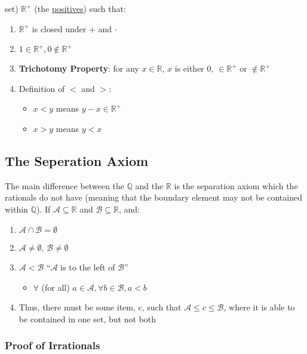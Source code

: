 \documentclass[11 pt, twoside]{article}
\begin{document}
set) $\mathbb{R}^+$ (the \underline{positives}) such that:
\begin{enumerate}
\item $\mathbb{R}^+$ is closed under $+$ and $\cdot$
\item $1 \in \mathbb{R}^+, 0 \notin \mathbb{R}^+$
\item \textbf{Trichotomy Property}: for any $x \in \mathbb{R}$, $x$ is
either $0$, $\in \mathbb{R}^+$ or $\notin \mathbb{R}^+$

\item Definition of $<$ and $>$:
\begin{itemize}
\item $x < y$ means $y - x \in \mathbb{R}^+$
\item $x > y$ means $y < x$
\end{itemize}
\end{enumerate}

\subsection{The Seperation Axiom}

The main difference between the $\mathbb{Q}$ and the $\mathbb{R}$ is the
separation axiom which the rationals do not have (meaning that the boundary element may not be contained within $\mathbb{Q}$). If $\mathcal{A} \subseteq \mathbb{R}$ and $\mathcal{B} \subseteq \mathbb{R}$, and:

\begin{enumerate}
\item $\mathcal{A} \cap \mathcal{B} = \emptyset$
\item $\mathcal{A} \neq \emptyset$, $\mathcal{B} \neq \emptyset$
\item $\mathcal{A} < \mathcal{B}$ ``$\mathcal{A}$ is to the left of
$\mathcal{B}$''
\begin{itemize}
\item $\forall$ (for all) $a \in \mathcal{A}, \forall b \in \mathcal{B}, a < b$
\end{itemize}
\item Thus, there must be some item, c, such that $\mathcal{A} \leq c \leq \mathcal{B}$, where it is able to be contained in one set, but not both
\end{enumerate}

\subsubsection{Proof of Irrationals}
\end{document}
